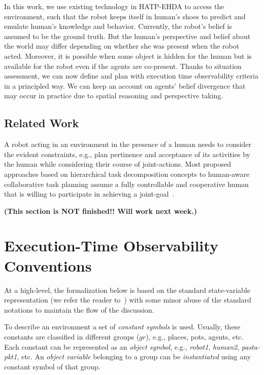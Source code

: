 \documentclass[letterpaper]{article} %
\begin{document}
In this work, we use existing technology in HATP-EHDA to access the environment, such that the robot keeps itself in human's shoes to predict and emulate human's knowledge and behavior. Currently, the robot's belief is assumed to be the ground truth. But the human's perspective and belief about the world may differ depending on whether she was present when the robot acted. Moreover, it is possible when some object is hidden for the human but is available for the robot even if the agents are co-present. Thanks to situation assessment, we can now define and plan with execution time observability criteria in a principled way. We can keep an account on agents' belief divergence that may occur in practice due to spatial reasoning and perspective taking. 

\subsection{Related Work}
A robot acting in an environment in the presence of a human needs to consider the evident constraints, e.g., plan pertinence and acceptance of its activities by the human while considering their course of joint-actions.
Most proposed approaches based on hierarchical task decomposition concepts to human-aware collaborative task planning assume a fully controllable and cooperative human that is willing to participate in achieving a joint-goal~\cite{sebastiani2017dealing,alami2006toward,lallement2014hatp,lallement2018hatp}.

\textbf{(This section is NOT finished!! Will work next week.)}

\section{Execution-Time Observability Conventions}
At a high-level, the formalization below is based on the standard state-variable representation (we refer the reader to~\cite{naubooks0014222}) with some minor abuse of the standard notations to maintain the flow of the discussion.

To describe an environment a set of \textit{constant symbols} is used. Usually, these constants are classified in different groups ($gr$), e.g., places, pots, agents, etc. 
Each constant can be represented as an \textit{object symbol}, e.g., \textit{robot1}, \textit{human2}, \textit{pasta-pkt1}, etc. 
An \textit{object variable} belonging to a group can be \textit{instantiated} using any constant symbol of that group.
\end{document}
